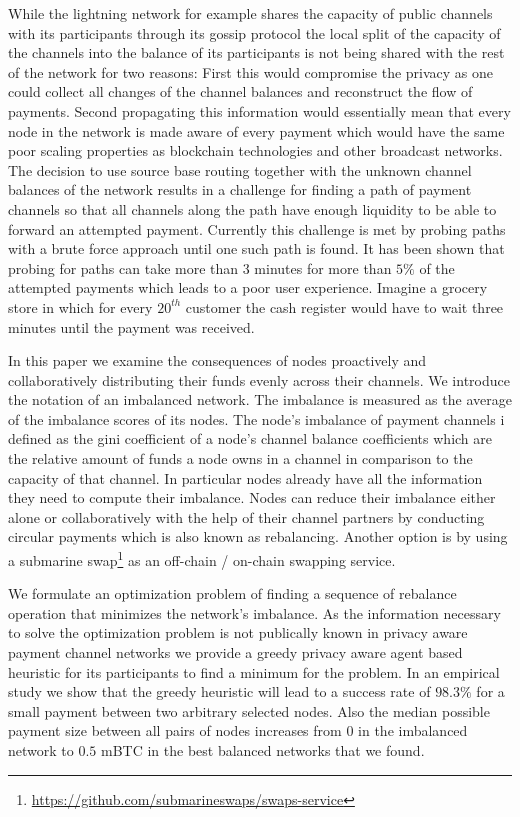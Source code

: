 \documentclass[a4paper]{paper}
\begin{document}
While the lightning network for example shares the capacity of public channels with its participants through its gossip protocol the local split of the capacity of the channels into the balance of its participants is not being shared with the rest of the network for two reasons:
First this would compromise the privacy as one could collect all changes of the channel balances and reconstruct the flow of payments.
Second propagating this information would essentially mean that every node in the network is made aware of every payment which would have the same poor scaling properties as blockchain technologies and other broadcast networks.
The decision to use source base routing together with the unknown channel balances of the network results in a challenge for finding a path of payment channels so that all channels along the path have enough liquidity to be able to forward an attempted payment.
Currently this challenge is met by probing paths with a brute force approach until one such path is found.
It has been shown that probing for paths can take more than 3 minutes for more than $5\%$ of the attempted payments \cite{decker2019lnconf} which leads to a poor user experience.
Imagine a grocery store in which for every $20^{th}$ customer the cash register would have to wait three minutes until the payment was received.

In this paper we examine the consequences of nodes proactively and collaboratively distributing their funds evenly across their channels.
We introduce the notation of an imbalanced network.
The imbalance is measured as the average of the imbalance scores of its nodes.
The node's imbalance of payment channels i defined as the gini coefficient of a node's channel balance coefficients which are the relative amount of funds a node owns in a channel in comparison to the capacity of that channel.
In particular nodes already have all the information they need to compute their imbalance. 
Nodes can reduce their imbalance either alone or collaboratively with the help of their channel partners by conducting circular payments which is also known as rebalancing.
Another option is by using a submarine swap\footnote{\url{https://github.com/submarineswaps/swaps-service}} as an off-chain / on-chain swapping service.

We formulate an optimization problem of finding a sequence of rebalance operation that minimizes the network's imbalance.
As the information necessary to solve the optimization problem is not publically known in privacy aware payment channel networks we provide a greedy privacy aware agent based heuristic for its participants to find a minimum for the problem. 
In an empirical study we show that the greedy heuristic will lead to a success rate of $98.3\%$ for a small payment between two arbitrary selected nodes.
Also the median possible payment size between all pairs of nodes increases from $0$ in the imbalanced network to $0.5$ mBTC in the best balanced networks that we found.
\end{document}

